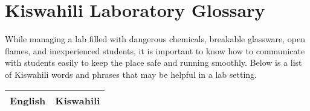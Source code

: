\chapter{Kiswahili Laboratory Glossary}

While managing a lab filled with dangerous chemicals, breakable glassware, open flames, and inexperienced students, it is important to know how to communicate with students easily to keep the place safe and running smoothly. Below is a list of Kiswahili words and phrases that may be helpful in a lab setting.

\begin{center}
\begin{longtable}{|p{}|p{}|}\hline

\multicolumn{1}{|c|}{\textbf{English}}	&	\multicolumn{1}{c|}{\textbf{Kiswahili}}	\\	\hline


\end{longtable}
\end{center}

